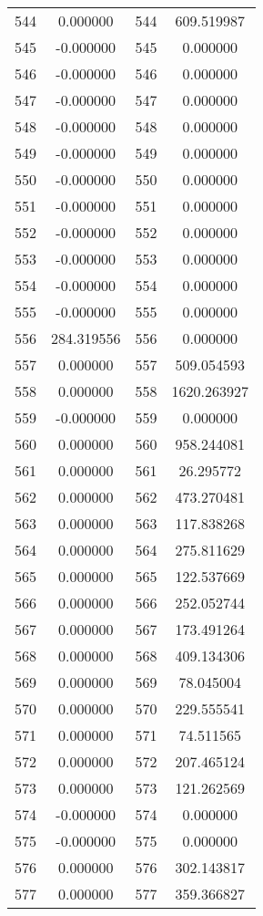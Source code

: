 \documentclass[12pt]{article}
\begin{document}
\begin{longtable}{@{}cccc@{}}
544 & 0.000000 & 544 & 609.519987 \\
545 & -0.000000 & 545 & 0.000000 \\
546 & -0.000000 & 546 & 0.000000 \\
547 & -0.000000 & 547 & 0.000000 \\
548 & -0.000000 & 548 & 0.000000 \\
549 & -0.000000 & 549 & 0.000000 \\
550 & -0.000000 & 550 & 0.000000 \\
551 & -0.000000 & 551 & 0.000000 \\
552 & -0.000000 & 552 & 0.000000 \\
553 & -0.000000 & 553 & 0.000000 \\
554 & -0.000000 & 554 & 0.000000 \\
555 & -0.000000 & 555 & 0.000000 \\
556 & 284.319556 & 556 & 0.000000 \\
557 & 0.000000 & 557 & 509.054593 \\
558 & 0.000000 & 558 & 1620.263927 \\
559 & -0.000000 & 559 & 0.000000 \\
560 & 0.000000 & 560 & 958.244081 \\
561 & 0.000000 & 561 & 26.295772 \\
562 & 0.000000 & 562 & 473.270481 \\
563 & 0.000000 & 563 & 117.838268 \\
564 & 0.000000 & 564 & 275.811629 \\
565 & 0.000000 & 565 & 122.537669 \\
566 & 0.000000 & 566 & 252.052744 \\
567 & 0.000000 & 567 & 173.491264 \\
568 & 0.000000 & 568 & 409.134306 \\
569 & 0.000000 & 569 & 78.045004 \\
570 & 0.000000 & 570 & 229.555541 \\
571 & 0.000000 & 571 & 74.511565 \\
572 & 0.000000 & 572 & 207.465124 \\
573 & 0.000000 & 573 & 121.262569 \\
574 & -0.000000 & 574 & 0.000000 \\
575 & -0.000000 & 575 & 0.000000 \\
576 & 0.000000 & 576 & 302.143817 \\
577 & 0.000000 & 577 & 359.366827 \\

\end{longtable}
\end{document}
